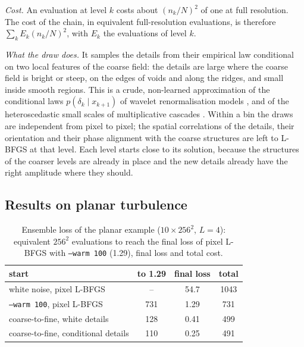 \emph{Cost.} An evaluation at level $k$ costs about $(n_k/N)^2$ of one at full resolution. The cost of the chain, in equivalent full-resolution evaluations, is therefore $\sum_k E_k (n_k/N)^2$, with $E_k$ the evaluations of level $k$.

\emph{What the draw does.} It samples the details from their empirical law conditional on two local features of the coarse field: the details are large where the coarse field is bright or steep, on the edges of voids and along the ridges, and small inside smooth regions. This is a crude, non-learned approximation of the conditional laws $p(\delta_k\mid x_{k+1})$ of wavelet renormalisation models \citep{marchand2022,kadkhodaie2023}, and of the heteroscedastic small scales of multiplicative cascades \citep{mandelbrot1974}. Within a bin the draws are independent from pixel to pixel; the spatial correlations of the details, their orientation and their phase alignment with the coarse structures are left to L-BFGS at that level. Each level starts close to its solution, because the structures of the coarser levels are already in place and the new details already have the right amplitude where they should.

\subsection{Results on planar turbulence}

\begin{table}
\caption{Ensemble loss of the planar example ($10\times256^2$, $L=4$): equivalent $256^2$ evaluations to reach the final loss of pixel L-BFGS with \texttt{--warm 100} (1.29), final loss and total cost.}
\label{tab:c2f}
\centering
\begin{tabular}{lccc}
\hline\hline
start & to 1.29 & final loss & total \\
\hline
white noise, pixel L-BFGS & -- & 54.7 & 1043 \\
\texttt{--warm 100}, pixel L-BFGS & 731 & 1.29 & 731 \\
coarse-to-fine, white details & 128 & 0.41 & 499 \\
coarse-to-fine, conditional details & 110 & 0.25 & 491 \\
\hline
\end{tabular}
\end{table}

